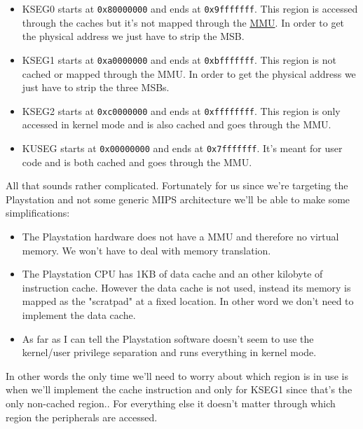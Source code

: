 \documentclass[a4paper]{article}
\newcommand{\code}[1] {\texttt{#1}}
\begin{document}
\begin{itemize}
\item KSEG0 starts at \code{0x80000000} and ends at
  \code{0x9fffffff}. This region is accessed through the caches but
  it's not mapped through the
  \href{https://en.wikipedia.org/wiki/Memory_management_unit}{MMU}. In
  order to get the physical address we just have to strip the MSB.

\item KSEG1 starts at \code{0xa0000000} and ends at
  \code{0xbfffffff}. This region is not cached or mapped through the
  MMU. In order to get the physical address we just have to strip the
  three MSBs.

\item KSEG2 starts at \code{0xc0000000} and ends at
  \code{0xffffffff}. This region is only accessed in kernel mode and
  is also cached and goes through the MMU.

\item KUSEG starts at \code{0x00000000} and ends at
  \code{0x7fffffff}. It's meant for user code and is both cached and
  goes through the MMU.
\end{itemize}

All that sounds rather complicated. Fortunately for us since we're
targeting the Playstation and not some generic MIPS architecture we'll
be able to make some simplifications:

\begin{itemize}
\item The Playstation hardware does not have a MMU and therefore no
  virtual memory. We won't have to deal with memory translation.

\item The Playstation CPU has 1KB of data cache and an other kilobyte
  of instruction cache. However the data cache is not used, instead
  its memory is mapped as the "scratpad" at a fixed location. In other
  word we don't need to implement the data cache.

\item As far as I can tell the Playstation software doesn't seem to
  use the kernel/user privilege separation and runs everything in
  kernel mode.
\end{itemize}

In other words the only time we'll need to worry about which region is
in use is when we'll implement the cache instruction and only for
KSEG1 since that's the only non-cached region.. For everything else it
doesn't matter through which region the peripherals are accessed.
\end{document}
